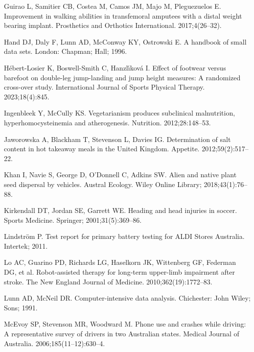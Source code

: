 \documentclass[
  11pt,
  a4paper,
  krantz2]{krantz}
\newlength{\cslhangindent}
\newenvironment{CSLReferences}[2] %
 {\begin{list}{}{%
  \setlength{\itemindent}{0pt}
  \setlength{\leftmargin}{0pt}
  \setlength{\parsep}{0pt}
  \ifodd #1
   \setlength{\leftmargin}{\cslhangindent}
   \setlength{\itemindent}{-1\cslhangindent}
  \fi
  \setlength{\itemsep}{#2\baselineskip}}}
 {\end{list}}
\begin{document}
\begin{footnotesize}
\begin{CSLReferences}{1}{0}
Guirao L, Samitier CB, Costea M, Camos JM, Majo M, Pleguezuelos E. Improvement in walking abilities in transfemoral amputees with a distal weight bearing implant. Prosthetics and Orthotics International. 2017;4(26--32).

Hand DJ, Daly F, Lunn AD, McConway KY, Ostrowski E. A handbook of small data sets. London: Chapman; Hall; 1996.

Hébert-Losier K, Boswell-Smith C, Hanzlı́ková I. Effect of footwear versus barefoot on double-leg jump-landing and jump height measures: A randomized cross-over study. International Journal of Sports Physical Therapy. 2023;18(4):845.

Ingenbleek Y, McCully KS. Vegetarianism produces subclinical malnutrition, hyperhomocysteinemia and atherogenesis. Nutrition. 2012;28:148--53.

Jaworowska A, Blackham T, Stevenson L, Davies IG. Determination of salt content in hot takeaway meals in the {U}nited {K}ingdom. Appetite. 2012;59(2):517--22.

Khan I, Navie S, George D, O'Donnell C, Adkins SW. Alien and native plant seed dispersal by vehicles. Austral Ecology. Wiley Online Library; 2018;43(1):76--88.

Kirkendall DT, Jordan SE, Garrett WE. Heading and head injuries in soccer. Sports Medicine. Springer; 2001;31(5):369--86.

Lindström P. Test report for primary battery testing for {ALDI} {S}tores {A}ustralia. Intertek; 2011.

Lo AC, Guarino PD, Richards LG, Haselkorn JK, Wittenberg GF, Federman DG, et al. Robot-assisted therapy for long-term upper-limb impairment after stroke. The {N}ew {E}ngland Journal of Medicine. 2010;362(19):1772--83.

Lunn AD, McNeil DR. Computer-intensive data analysis. Chichester: John Wiley; Sons; 1991.

McEvoy SP, Stevenson MR, Woodward M. Phone use and crashes while driving: A representative survey of drivers in two {A}ustralian states. Medical Journal of {A}ustralia. 2006;185(11--12):630--4.


\end{CSLReferences}
\end{footnotesize}
\end{document}
